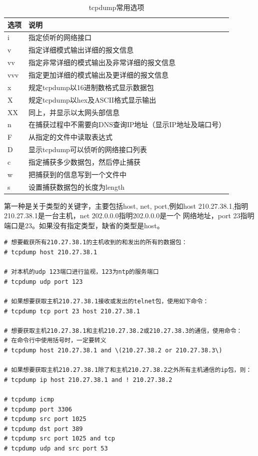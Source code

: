 \begin{table}[!h]
  \centering
  \begin{tabular}{ll}
    \toprule
    选项     & 说明 \\
    \midrule
    i     & 指定侦听的网络接口 \\
    v     & 指定详细模式输出详细的报文信息 \\
    vv    & 指定非常详细的模式输出及非常详细的报文信息 \\
    vvv   & 指定更加详细的模式输出及更详细的报文信息 \\
    x     & 规定tcpdump以16进制数格式显示数据包 \\
    X     & 规定tcpdump以hex及ASCII格式显示输出 \\
    XX    & 同上，并显示以太网头部信息 \\
    n     & 在捕获过程中不需要向DNS查询IP地址（显示IP地址及端口号） \\
    F     & 从指定的文件中读取表达式 \\
    D     & 显示tcpdump可以侦听的网络接口列表 \\
    c     & 指定捕获多少数据包，然后停止捕获 \\
    w     & 把捕获到的信息写到一个文件中 \\
    s     & 设置捕获数据包的长度为length \\
    \bottomrule
  \end{tabular}
  \caption{tcpdump常用选项}
  \label{tab:tcpdumpOptions}
\end{table}

第一种是关于类型的关键字，主要包括host, net, port,例如host
210.27.38.1,指明210.27.38.1是一台主机，net 202.0.0.0指明202.0.0.0是一个
网络地址，port 23指明端口是23。如果没有指定类型，缺省的类型是host。

\small{
\begin{verbatim}
# 想要截获所有210.27.38.1的主机收到的和发出的所有的数据包：
# tcpdump host 210.27.38.1

# 对本机的udp 123端口进行监视，123为ntp的服务端口
# tcpdump udp port 123

# 如果想要获取主机210.27.38.1接收或发出的telnet包，使用如下命令：
# tcpdump tcp port 23 host 210.27.38.1

# 想要获取主机210.27.38.1和主机210.27.38.2或210.27.38.3的通信，使用命令：
# 在命令行中使用括号时，一定要转义
# tcpdump host 210.27.38.1 and \(210.27.38.2 or 210.27.38.3\)

# 如果想要获取主机210.27.38.1除了和主机210.27.38.2之外所有主机通信的ip包，则：
# tcpdump ip host 210.27.38.1 and ! 210.27.38.2

# tcpdump icmp
# tcpdump port 3306
# tcpdump src port 1025
# tcpdump dst port 389
# tcpdump src port 1025 and tcp
# tcpdump udp and src port 53
\end{verbatim}
}
\normalsize

